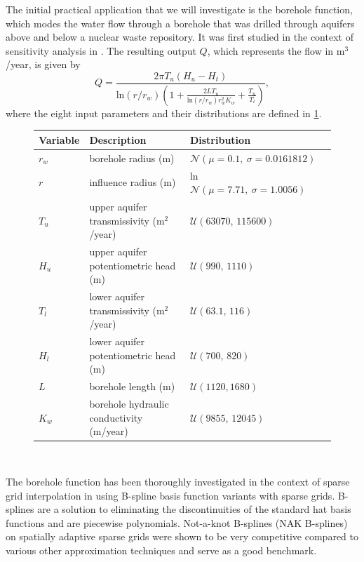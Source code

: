 \documentclass[
  a4paper,  %
  twoside,  %
  bibliography=totoc,
  headsepline,
  cleardoublepage=empty,
  parskip=half,
  draft=false
]{scrbook}
\begin{document}
The initial practical application that we will investigate is the borehole function, which modes the water flow through a borehole that was drilled through aquifers above and below a nuclear waste repository.
It was first studied in the context of sensitivity analysis in \cite{Harper1983}.
The resulting output $Q$, which represents the flow in m$^3$/year, is given by
\begin{equation}
Q=\frac{2 \pi T_u(H_u - H_t)}{\text{ln}(r / r_w) \left( 1 + \frac{2L T_u}{\text{ln}(r / r_w) r_w^2 K_w} + \frac{T_u}{T_l} \right)},
\end{equation}
where the eight input parameters and their distributions are defined in \cref{tab:borehole_params}.
\begin{mdframed}[style=style]
\begin{figure}[H]
\centering
\bgroup
\def\arraystretch{1.2}%
  \begin{tabular}{ l l l l}
Variable & Description & Distribution\\
\hline
$r_w$ & borehole radius (m) & $\mathcal{N}(\mu=0.1, ~\sigma=0.0161812)$\\
$r$ & influence radius (m) & ln $\mathcal{N}(\mu=7.71, ~\sigma=1.0056)$\\
$T_u$ & upper aquifer transmissivity (m$^2$/year) & $\mathcal{U}(63070,\, 115600)$\\
$H_u$ & upper aquifer potentiometric head (m) & $\mathcal{U}(990,\,  1110)$\\
$T_l$ & lower aquifer transmissivity (m$^2$/year) & $\mathcal{U}(63.1,\, 116)$\\
$H_l$ & lower aquifer potentiometric head (m) & $\mathcal{U}(700, \, 820)$\\
$L$ & borehole length (m) & $\mathcal{U}(1120, 1680)$\\
$K_w$ & borehole hydraulic conductivity (m/year) & $\mathcal{U}(9855, \, 12045)$\\
\end{tabular}
\egroup\\
\vspace{0.5em}
\delimit
{}
\label{tab:borehole_params}
\end{figure}
\end{mdframed}
%
The borehole function has been thoroughly investigated in the context of sparse grid interpolation in \cite{Rehme2021} using B-spline basis function variants with sparse grids.
B-splines are a solution to eliminating the discontinuities of the standard hat basis functions and are piecewise polynomials.
Not-a-knot B-splines (NAK B-splines) on spatially adaptive sparse grids were shown to be very competitive compared to various other approximation techniques and serve as a good benchmark.
\end{document}
